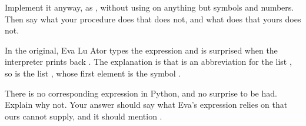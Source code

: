\begin{exerciseGroup}
Implement it anyway, as , without using \code{==} on anything
but symbols and numbers.  Then say what your procedure does that \code{==} does
not, and what \code{==} does that yours does not.

\label{Exercise 2.55}
 In the original, Eva Lu Ator types
the expression  and is surprised when the interpreter
prints back .  The explanation is that  is an abbreviation
for the list , so  is the list , whose first element is the symbol .

There is no corresponding expression in Python, and no surprise to be had.
Explain why not.  Your answer should say what Eva's expression relies on that
ours cannot supply, and it should mention .
\end{exerciseGroup}
